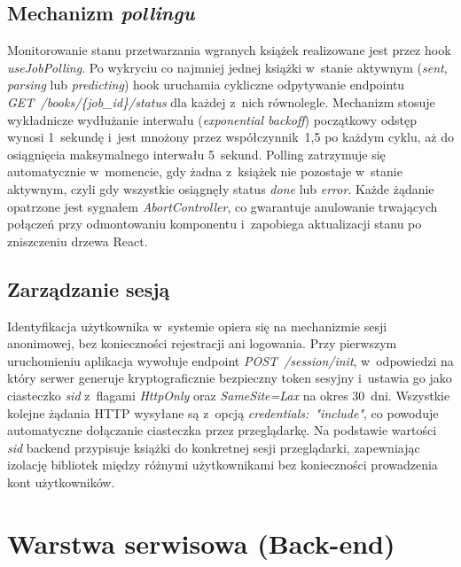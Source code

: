 \subsection{Mechanizm \textit{pollingu}}
Monitorowanie stanu przetwarzania wgranych książek realizowane jest przez 
hook \textit{useJobPolling}. Po wykryciu co najmniej jednej książki 
w~stanie aktywnym (\textit{sent}, \textit{parsing} lub \textit{predicting}) 
hook uruchamia cykliczne odpytywanie endpointu 
\textit{GET~\allowbreak/books/\{job\_id\}/status} dla każdej z~nich 
równolegle. Mechanizm stosuje wykładnicze wydłużanie interwału 
(\textit{exponential backoff}) początkowy odstęp wynosi 1~sekundę 
i~jest mnożony przez współczynnik~1,5 po każdym cyklu, aż do osiągnięcia 
maksymalnego interwału 5~sekund. Polling zatrzymuje się automatycznie 
w~momencie, gdy żadna z~książek nie pozostaje w~stanie aktywnym, 
czyli gdy wszystkie osiągnęły status \textit{done} lub \textit{error}. 
Każde żądanie opatrzone jest sygnałem \textit{AbortController}, 
co gwarantuje anulowanie trwających połączeń przy odmontowaniu komponentu 
i~zapobiega aktualizacji stanu po zniszczeniu drzewa React.

\subsection{Zarządzanie sesją}
Identyfikacja użytkownika w~systemie opiera się na mechanizmie sesji 
anonimowej, bez konieczności rejestracji ani logowania. Przy pierwszym 
uruchomieniu aplikacja wywołuje endpoint \textit{POST~\allowbreak/session/init}, 
w~odpowiedzi na który serwer generuje kryptograficznie bezpieczny token 
sesyjny i~ustawia go jako ciasteczko \textit{sid} z~flagami 
\textit{HttpOnly} oraz \textit{SameSite=Lax} na okres 30~dni. 
Wszystkie kolejne żądania HTTP wysyłane są z~opcją 
\textit{credentials:~"include"}, co powoduje automatyczne dołączanie 
ciasteczka przez przeglądarkę. Na podstawie wartości \textit{sid} backend 
przypisuje książki do konkretnej sesji przeglądarki, zapewniając izolację 
bibliotek między różnymi użytkownikami bez konieczności prowadzenia 
kont użytkowników.



\section{Warstwa serwisowa (Back-end)}
